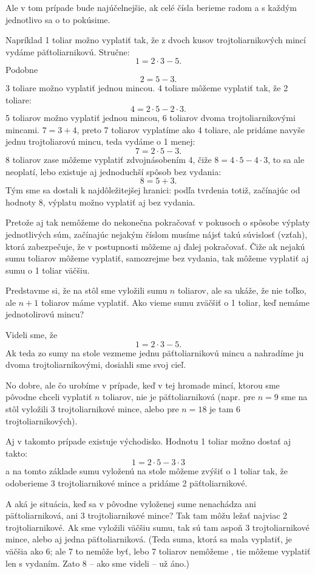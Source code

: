 {{Ale v tom prípade bude najúčelnejšie, ak celé čísla berieme radom a s každým jednotlivo sa o to pokúsime.

Napríklad 1 toliar možno vyplatiť tak, že z dvoch kusov trojtoliarnikových mincí vydáme päťtoliarnikovú. Stručne:
$$1=2\cdot 3 -5.$$
Podobne $$2=5-3.$$
3 toliare možno vyplatiť jednou mincou.
4 toliare môžeme vyplatiť tak, že  2 toliare:
$$4=2\cdot 5 - 2\cdot 3.$$
5 toliarov možno vyplatiť jednou mincou, 6 toliarov dvoma trojtoliarnikovými mincami.
$7=3+4$, preto 7 toliarov vyplatíme ako 4 toliare, ale pridáme navyše jednu trojtoliarovú mincu, teda vydáme o 1 menej: $$7=2\cdot 5 - 3.$$
8 toliarov zase môžeme vyplatiť zdvojnásobením 4, čiže $8=4\cdot 5- 4\cdot 3$, to sa ale neoplatí, lebo existuje aj jednoduchší spôsob bez vydania: $$8=5+3.$$
Tým sme sa dostali k najdôležitejšej hranici: podľa tvrdenia totiž, začínajúc od hodnoty 8, výplatu možno vyplatiť aj bez vydania.

Pretože aj tak nemôžeme do nekonečna pokračovať v pokusoch o spôsobe výplaty jednotlivých súm, začínajúc nejakým číslom musíme nájsť takú súvislosť (vzťah), ktorá zabezpečuje, že v postupnosti môžeme aj ďalej pokračovať. Čiže ak nejakú sumu toliarov môžeme vyplatiť, samozrejme bez vydania, tak môžeme vyplatiť aj sumu o 1 toliar väčšiu.

Predstavme si, že na stôl sme vyložili sumu $n$ toliarov, ale sa ukáže, že nie toľko, ale $n+1$ toliarov máme vyplatiť. Ako vieme sumu zväčšiť o 1 toliar, keď nemáme jednotolirovú mincu?

Videli sme, že
$$1=2\cdot 3- 5.$$
Ak teda zo sumy na stole vezmeme jednu päťtoliarnikovú mincu a nahradíme ju dvoma trojtoliarnikovými, dosiahli sme svoj cieľ.

No dobre, ale čo urobíme v prípade, keď v tej hromade mincí, ktorou sme pôvodne chceli vyplatiť $n$ toliarov, nie je päťtoliarniková (napr. pre $n=9$ sme na stôl vyložili 3 trojtoliarnikové mince, alebo pre $n=18$ je tam 6 trojtoliarnikových).

Aj v takomto prípade existuje východisko. Hodnotu 1 toliar možno dostať aj takto: $$1=2\cdot 5 - 3\cdot 3$$ a na tomto základe sumu vyloženú na stole môžeme zvýšiť o 1 toliar tak, že odoberieme 3 trojtoliarnikové mince a pridáme 2 päťtoliarnikové.

A aká je situácia, keď sa v pôvodne vyloženej sume nenachádza ani päťtoliarniková, ani 3 trojtoliarnikové mince? Tak tam môžu ležať najviac 2 trojtoliarnikové. Ak sme vyložili väčšiu sumu, tak sú tam aspoň 3 trojtoliarnikové mince, alebo aj jedna päťtoliarniková. (Teda suma, ktorá sa mala vyplatiť, je väčšia ako 6; ale 7 to nemôže byť, lebo 7 toliarov nemôžeme , tie môžeme vyplatiť len s vydaním. Zato 8 -- ako sme videli -- už áno.)

}}
